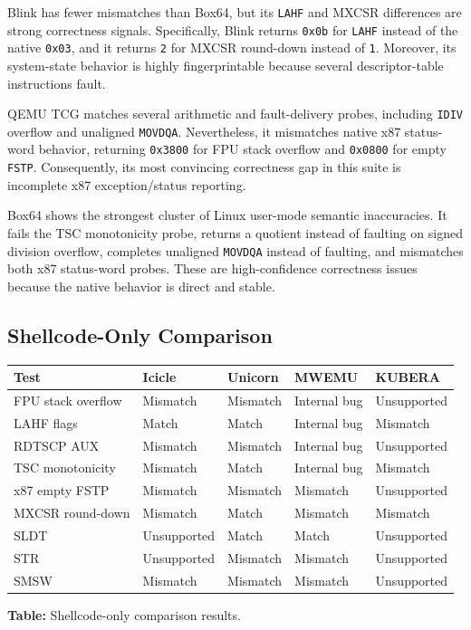 Blink has fewer mismatches than Box64, but its \texttt{LAHF} and MXCSR differences are strong correctness signals. Specifically, Blink returns \texttt{0x0b} for \texttt{LAHF} instead of the native \texttt{0x03}, and it returns \texttt{2} for MXCSR round-down instead of \texttt{1}. Moreover, its system-state behavior is highly fingerprintable because several descriptor-table instructions fault.

QEMU TCG matches several arithmetic and fault-delivery probes, including \texttt{IDIV} overflow and unaligned \texttt{MOVDQA}. Nevertheless, it mismatches native x87 status-word behavior, returning \texttt{0x3800} for FPU stack overflow and \texttt{0x0800} for empty \texttt{FSTP}. Consequently, its most convincing correctness gap in this suite is incomplete x87 exception/status reporting.

Box64 shows the strongest cluster of Linux user-mode semantic inaccuracies. It fails the TSC monotonicity probe, returns a quotient instead of faulting on signed division overflow, completes unaligned \texttt{MOVDQA} instead of faulting, and mismatches both x87 status-word probes. These are high-confidence correctness issues because the native behavior is direct and stable.

\subsection{Shellcode-Only Comparison}

\begin{center}
\centering
\small
\begin{tabular}{@{}lllll@{}}
\toprule
Test & Icicle & Unicorn & MWEMU & KUBERA \\
\midrule
FPU stack overflow & Mismatch & Mismatch & Internal bug & Unsupported \\
LAHF flags & Match & Match & Internal bug & Mismatch \\
RDTSCP AUX & Mismatch & Mismatch & Internal bug & Unsupported \\
TSC monotonicity & Mismatch & Match & Internal bug & Mismatch \\
x87 empty FSTP & Mismatch & Mismatch & Mismatch & Unsupported \\
MXCSR round-down & Mismatch & Match & Mismatch & Mismatch \\
SLDT & Unsupported & Match & Match & Unsupported \\
STR & Unsupported & Mismatch & Mismatch & Unsupported \\
SMSW & Mismatch & Mismatch & Mismatch & Unsupported \\
\bottomrule
\end{tabular}

\textbf{Table:} Shellcode-only comparison results.
\end{center}

